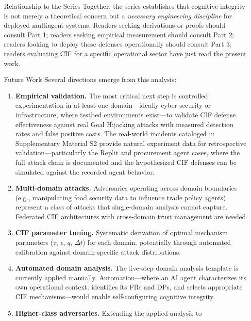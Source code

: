 \documentclass[
  ignorenonframetext,
]{beamer}
\begin{document}
\begin{frame}[allowframebreaks]{Relationship to the Series}
Together, the series establishes that cognitive integrity is not merely
a theoretical concern but a \emph{necessary engineering discipline} for
deployed multiagent systems. Readers seeking derivations or proofs
should consult Part 1; readers seeking empirical measurement should
consult Part 2; readers looking to deploy these defenses operationally
should consult Part 3; readers evaluating CIF for a specific operational
sector have just read the present work.
\end{frame}

\begin{frame}[allowframebreaks]{Future Work}
\protect{}\label{future-work}
Several directions emerge from this analysis:

\begin{enumerate}
\item
  \textbf{Empirical validation.} The most critical next step is
  controlled experimentation in at least one domain---ideally
  cyber-security or infrastructure, where testbed environments
  exist---to validate CIF defense effectiveness against real Goal
  Hijacking attacks with measured detection rates and false positive
  costs. The real-world incidents cataloged in Supplementary Material S2
  provide natural experiment data for retrospective
  validation---particularly the Replit and procurement agent cases,
  where the full attack chain is documented and the hypothesized CIF
  defenses can be simulated against the recorded agent behavior.
\item
  \textbf{Multi-domain attacks.} Adversaries operating across domain
  boundaries (e.g., manipulating food security data to influence trade
  policy agents) represent a class of attacks that single-domain
  analysis cannot capture. Federated CIF architectures with cross-domain
  trust management are needed.
\item
  \textbf{CIF parameter tuning.} Systematic derivation of optimal
  mechanism parameters (\(\tau\), \(\epsilon\), \(q\), \(\Delta t\)) for
  each domain, potentially through automated calibration against
  domain-specific attack distributions.
\item
  \textbf{Automated domain analysis.} The five-step domain analysis
  template is currently applied manually. Automation---where an AI agent
  characterizes its own operational context, identifies its FRs and DPs,
  and selects appropriate CIF mechanisms---would enable self-configuring
  cognitive integrity.
\item
  \textbf{Higher-class adversaries.} Extending the applied analysis to

\end{enumerate}
\end{frame}
\end{document}
